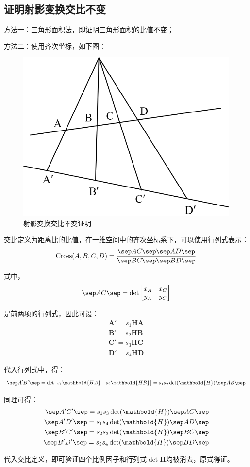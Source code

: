 \documentclass[11pt]{article}
\begin{document}
\subsection{证明射影变换交比不变}
方法一：三角形面积法，即证明三角形面积的比值不变；\par
方法二：使用齐次坐标，如下图：
\begin{figure}[H]
  \centering
  \includegraphics[width=0.5\linewidth]{证明题1.png}
  \caption{射影变换交比不变证明}
\end{figure}\par
交比定义为距离比的比值，在一维空间中的齐次坐标系下，可以使用行列式表示：
$$
  \mathrm{Cross}(A,B,C,D)=\frac{
    \sep AC\sep \sep AD\sep
  }{\sep BC\sep \sep BD\sep }
$$\par
式中，
$$
  \sep AC\sep =\det\begin{bmatrix}
    x_A & x_C \\
    y_A & y_C \\
  \end{bmatrix}
$$\par
是前两项的行列式，因此可设：
$$
  \begin{aligned}
    \mathbold{A}'=s_1\mathbold{HA} \\
    \mathbold{B}'=s_2\mathbold{HB} \\
    \mathbold{C}'=s_3\mathbold{HC} \\
    \mathbold{D}'=s_4\mathbold{HD}
  \end{aligned}
$$\par
代入行列式中，得：
$$
  \begin{aligned}
    \sep A'B'\sep =\det\begin{bmatrix}
                         s_1\mathbold{HA} & s_2\mathbold{HB}
                       \end{bmatrix}=s_1s_2\det(\mathbold{H})\sep AB\sep
  \end{aligned}
$$\par
同理可得：
$$
  \begin{aligned}
    \sep A'C'\sep =s_1s_3\det(\mathbold{H})\sep AC\sep \\
    \sep A'D'\sep =s_1s_4\det(\mathbold{H})\sep AD\sep \\
    \sep B'C'\sep =s_2s_3\det(\mathbold{H})\sep BC\sep \\
    \sep B'D'\sep =s_2s_4\det(\mathbold{H})\sep BD\sep \\
  \end{aligned}
$$\par
代入交比定义，即可验证四个比例因子和行列式$\det\mathbold{H}$均被消去，原式得证。
\end{document}
